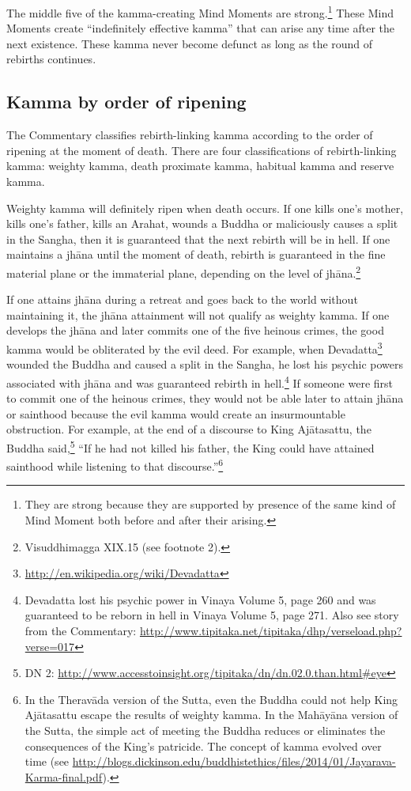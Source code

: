 The middle five of the kamma-creating Mind Moments are strong.\footnote{They are strong because they are supported by presence of the same kind of Mind Moment both before and after their arising.} These Mind Moments create “indefinitely effective kamma” that can arise any time after the next existence. These kamma never become defunct as long as the round of rebirths continues.

\subsection*{Kamma by order of ripening}

The Commentary classifies rebirth-linking kamma according to the order of ripening at the moment of death. There are four classifications of rebirth-linking kamma: weighty kamma, death proximate kamma, habitual kamma and reserve kamma.

Weighty kamma will definitely ripen when death occurs. If one kills one’s mother, kills one’s father, kills an Arahat, wounds a Buddha or maliciously causes a split in the Sangha, then it is guaranteed that the next rebirth will be in hell. If one maintains a jhāna until the moment of death, rebirth is guaranteed in the fine material plane or the immaterial plane, depending on the level of jhāna.\footnote{Visuddhimagga XIX.15 (see footnote 2).} 

If one attains jhāna during a retreat and goes back to the world without maintaining it, the jhāna attainment will not qualify as weighty kamma. If one develops the jhāna and later commits one of the five heinous crimes, the good kamma would be obliterated by the evil deed. For example, when Devadatta\footnote{\url{http://en.wikipedia.org/wiki/Devadatta}} wounded the Buddha and caused a split in the Sangha, he lost his psychic powers associated with jhāna and was guaranteed rebirth in hell.\footnote{Devadatta lost his psychic power in Vinaya Volume 5, page 260 and was guaranteed to be reborn in hell in Vinaya Volume 5, page 271. Also see story from the Commentary: \url{http://www.tipitaka.net/tipitaka/dhp/verseload.php?verse=017}} If someone were first to commit one of the heinous crimes, they would not be able later to attain jhāna or sainthood because the evil kamma would create an insurmountable obstruction. For example, at the end of a discourse to King Ajātasattu, the Buddha said,\footnote{DN 2: \url{http://www.accesstoinsight.org/tipitaka/dn/dn.02.0.than.html\#eye}} “If he had not killed his father, the King could have attained sainthood while listening to that discourse.”\footnote{In the Theravāda version of the Sutta, even the Buddha could not help King Ajātasattu escape the results of weighty kamma. In the Mahāyāna version of the Sutta, the simple act of meeting the Buddha reduces or eliminates the consequences of the King’s patricide. The concept of kamma evolved over time (see \url{http://blogs.dickinson.edu/buddhistethics/files/2014/01/Jayarava-Karma-final.pdf}).}

